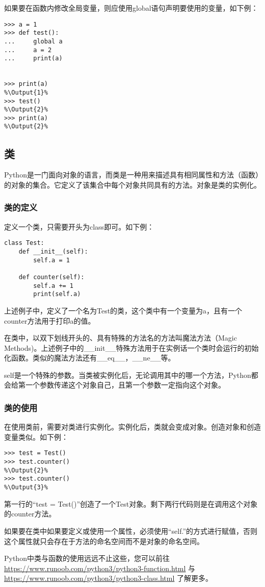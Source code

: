 如果要在函数内修改全局变量，则应使用global语句声明要使用的变量，如下例：
\begin{lstlisting}
>>> a = 1
>>> def test():
...     global a
...     a = 2
...     print(a)


>>> print(a)
%\Output{1}%
>>> test()
%\Output{2}%
>>> print(a)
%\Output{2}%
\end{lstlisting}

\subsection{类}
Python是一门面向对象的语言，而类是一种用来描述具有相同属性和方法（函数）的对象的集合。它定义了该集合中每个对象共同具有的方法。对象是类的实例化。

\subsubsection{类的定义}
定义一个类，只需要开头为class即可。如下例：

\begin{lstlisting}
class Test:
    def __init__(self):
        self.a = 1

    def counter(self):
        self.a += 1
        print(self.a)
\end{lstlisting}

上述例子中，定义了一个名为Test的类，这个类中有一个变量为a，且有一个counter方法用于打印a的值。
\begin{ExtraKnowledge}
    在类中，以双下划线开头的、具有特殊的方法名的方法叫魔法方法（Magic Methods)。上述例子中的\_\_init\_\_特殊方法用于在实例话一个类时会运行的初始化函数。类似的魔法方法还有\_\_eq\_\_，\_\_ne\_\_等。

    self是一个特殊的参数。当类被实例化后，无论调用其中的哪一个方法，Python都会给第一个参数传递这个对象自己，且第一个参数一定指向这个对象。
\end{ExtraKnowledge}

\subsubsection{类的使用}
在使用类前，需要对类进行实例化。实例化后，类就会变成对象。创造对象和创造变量类似。如下例：

\begin{lstlisting}
>>> test = Test()
>>> test.counter()
%\Output{2}%
>>> test.counter()
%\Output{3}%
\end{lstlisting}

第一行的“test = Test()”创造了一个Test对象。剩下两行代码则是在调用这个对象的counter方法。

如果要在类中如果要定义或使用一个属性，必须使用“self.”的方式进行赋值，否则这个属性就只会存在于方法的命名空间而不是对象的命名空间。

\begin{ExtraKnowledge}
    Python中类与函数的使用远远不止这些，您可以前往 \url{https://www.runoob.com/python3/python3-function.html} 与 \url{https://www.runoob.com/python3/python3-class.html} 了解更多。
\end{ExtraKnowledge}
